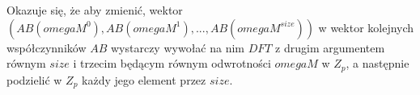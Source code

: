 \documentclass{article}
\begin{document}
Okazuje się, że aby zmienić, wektor $(AB(omegaM^0),AB(omegaM^1),...,AB(omegaM^{size}))$ w wektor kolejnych współczynników $AB$ wystarczy wywołać na nim $DFT$ z drugim argumentem równym $size$ i trzecim 
będącym równym odwrotności $omegaM$ w $Z_p$, a następnie podzielić w $Z_p$ każdy jego element przez $size$. 
\end{document}
